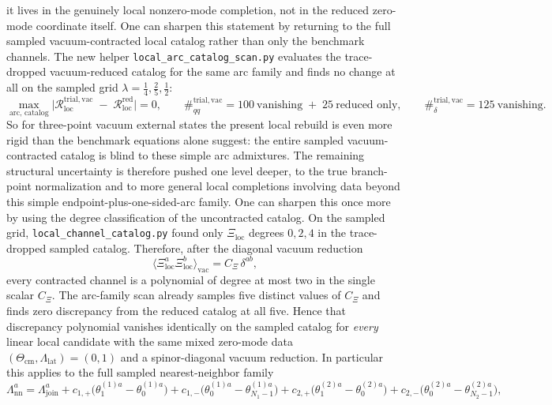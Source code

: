\documentclass[11pt]{article}
\numberwithin{equation}{section}
\begin{document}
it lives in the genuinely local nonzero-mode completion, not in the reduced
zero-mode coordinate itself.
One can sharpen this statement by returning to the full sampled
vacuum-contracted local catalog rather than only the benchmark channels. The
new helper \texttt{local\_arc\_catalog\_scan.py} evaluates the trace-dropped
vacuum-reduced catalog for the same arc family and finds no change at all on
the sampled grid $\lambda=\frac14,\frac25,\frac12$:
\begin{equation}
\label{eq:s14-023o}
\max_{\mathrm{arc},\,\mathrm{catalog}}
\bigl|
\mathcal{R}^{\mathrm{trial,vac}}_{\mathrm{loc}}
\;-\;
\mathcal{R}^{\mathrm{red}}_{\mathrm{loc}}
\bigr|
=0,
\qquad
\#_{qq}^{\mathrm{trial,vac}}
=
100\ \text{vanishing}
\;+\;
25\ \text{reduced only},
\qquad
\#_{\delta}^{\mathrm{trial,vac}}
=
125\ \text{vanishing}.
\end{equation}
So for three-point vacuum external states the present local rebuild is even
more rigid than the benchmark equations alone suggest: the entire sampled
vacuum-contracted catalog is blind to these simple arc admixtures. The
remaining structural uncertainty is therefore pushed one level deeper, to the
true branch-point normalization and to more general local completions involving
data beyond this simple endpoint-plus-one-sided-arc family.
One can sharpen this once more by using the degree classification of the
uncontracted catalog. On the sampled grid, \texttt{local\_channel\_catalog.py}
found only $\Xi_{\mathrm{loc}}$ degrees $0,2,4$ in the trace-dropped sampled
catalog. Therefore, after the diagonal vacuum reduction
\[
\langle \Xi_{\mathrm{loc}}^a \Xi_{\mathrm{loc}}^b \rangle_{\mathrm{vac}}
=
C_\Xi\,\delta^{ab},
\]
every contracted channel is a polynomial of degree at most two in the single
scalar $C_\Xi$. The arc-family scan already samples five distinct values of
$C_\Xi$ and finds zero discrepancy from the reduced catalog at all five. Hence
that discrepancy polynomial vanishes identically on the sampled catalog for
\emph{every} linear local candidate with the same mixed zero-mode data
$(\Theta_{\mathrm{cm}},\Lambda_{\mathrm{lat}})=(0,1)$ and a spinor-diagonal
vacuum reduction. In particular this applies to the full sampled
nearest-neighbor family
\begin{equation}
\label{eq:s14-023oa}
\Lambda_{\mathrm{nn}}^a
=
\Lambda_{\mathrm{join}}^a
+c_{1,+}\bigl(\theta_1^{(1)a}-\theta_0^{(1)a}\bigr)
+c_{1,-}\bigl(\theta_0^{(1)a}-\theta_{N_1-1}^{(1)a}\bigr)
+c_{2,+}\bigl(\theta_1^{(2)a}-\theta_0^{(2)a}\bigr)
+c_{2,-}\bigl(\theta_0^{(2)a}-\theta_{N_2-1}^{(2)a}\bigr),
\end{equation}
\end{document}
